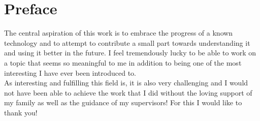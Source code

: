 \chapter*{Preface}

The central aspiration of this work is to embrace the progress of a known technology and to attempt to contribute a small part towards understanding it and using it better in the future. I feel tremendously lucky to be able to work on a topic that seems so meaningful to me in addition to being one of the most interesting I have ever been introduced to. \\

As interesting and fulfilling this field is, it is also very challenging and I would not have been able to achieve the work that I did without the loving support of my family as well as the guidance of my supervisors! For this I would like to thank you!